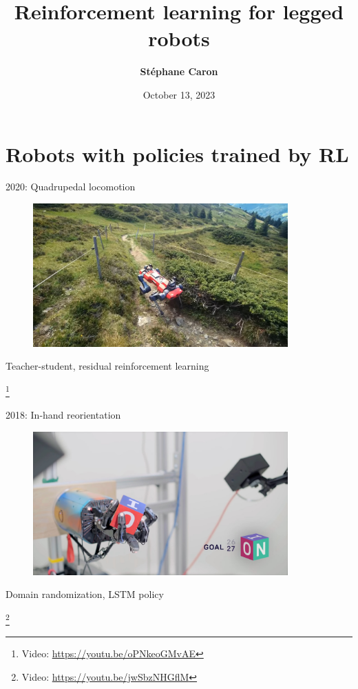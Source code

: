 \documentclass[9pt, aspectratio=169]{beamer}
\title{
    Reinforcement learning for legged robots
}
\author{\textbf{St\'ephane Caron}}
\date{October 13, 2023}
\institute{Inria--\'{E}cole normale sup\'{e}rieure}
\newcommand\blfootnote[1]{%
  \begingroup
  \renewcommand\thefootnote{}%
  \footnote{#1}%
  \addtocounter{footnote}{-1}%
  \endgroup
}
\begin{document}
\maketitle


\section*{Robots with policies trained by RL}

\begin{frame}{2020: Quadrupedal locomotion~\cite{lee2020}}
    \vspace{1.5em}
    \begin{figure}
        \includegraphics[height=5.5cm]{figures/hike-with-anymal.jpg}
    \end{figure}
    \begin{center}
        Teacher-student, residual reinforcement learning
    \end{center}
    \blfootnote{
        Video: \url{https://youtu.be/oPNkeoGMvAE}
    }
\end{frame}

\begin{frame}{2018: In-hand reorientation}
    \vspace{1.5em}
    \begin{figure}
        \includegraphics[height=5.5cm]{figures/in-hand-reorientation.jpg}
    \end{figure}
    \begin{center}
        Domain randomization, LSTM policy
    \end{center}
    \blfootnote{
        Video: \url{https://youtu.be/jwSbzNHGflM}
    }
\end{frame}
\end{document}
